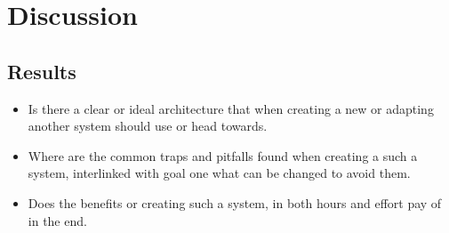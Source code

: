 %
%
%
%
%
%

\section{Discussion}
\label{sec:discussion}

\subsection{Results}

\begin{itemize}
  \item Is there a clear or ideal architecture that when creating a new or adapting another system should use or head towards.\\
    \item Where are the common traps and pitfalls found when creating a such a system, interlinked  with goal one what can be changed to avoid them.\\
  \item Does the benefits or creating such a system, in both hours and effort pay of in the end. \\
\end{itemize}

